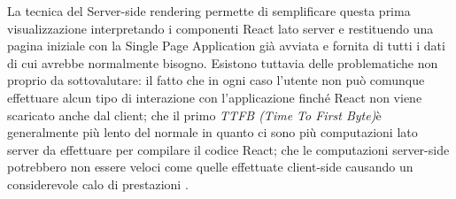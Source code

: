 La tecnica del Server-side rendering permette di semplificare questa prima visualizzazione interpretando i componenti React lato server e restituendo una pagina iniziale con la Single Page Application già avviata e fornita di tutti i dati di cui avrebbe normalmente bisogno. Esistono tuttavia delle problematiche non proprio da sottovalutare: il fatto che in ogni caso l'utente non può comunque effettuare alcun tipo di interazione con l'applicazione finché React non viene scaricato anche dal client; che il primo \textit{TTFB (Time To First Byte)}\footnotemark è generalmente più lento del normale in quanto ci sono più computazioni lato server da effettuare per compilare il codice React; che le computazioni server-side potrebbero non essere veloci come quelle effettuate client-side causando un considerevole calo di prestazioni \cite{GrigoryanOnServerSideRendering}.

